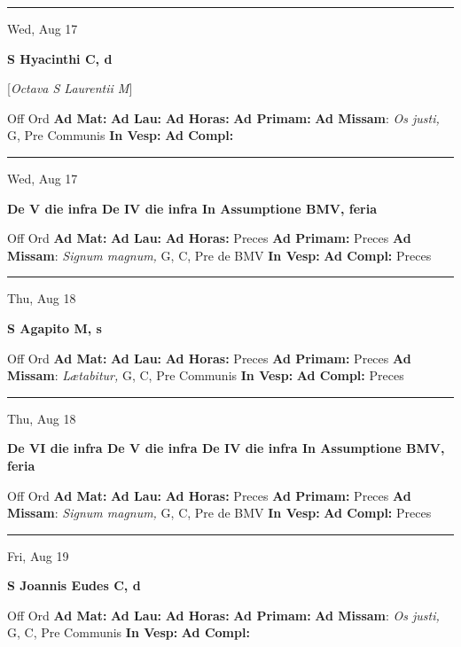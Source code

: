\documentclass[letterpaper, 10pt]{article}
\begin{document}
\hrule
\begin{center}
Wed, Aug 17
\end{center}\textbf{ \large S Hyacinthi C, \textnormal{\normalsize d}}

[\textit{Octava S Laurentii M}]
\begin{justify}
Off Ord
\textbf{Ad Mat: }
\textbf{Ad Lau: }
\textbf{Ad Horas: }
\textbf{Ad Primam: }
\textbf{Ad Missam}: \textit{Os justi,} G, Pre Communis
\textbf{In Vesp: }
\textbf{Ad Compl: }\end{justify}



\hrule
\begin{center}
Wed, Aug 17
\end{center}\textbf{ \large De V die infra De IV die infra In Assumptione BMV, \textnormal{\normalsize feria}}
\begin{justify}
Off Ord
\textbf{Ad Mat: }
\textbf{Ad Lau: }
\textbf{Ad Horas: }Preces
\textbf{Ad Primam: }Preces
\textbf{Ad Missam}: \textit{Signum magnum,} G, C, Pre de BMV
\textbf{In Vesp: }
\textbf{Ad Compl: }Preces\end{justify}



\hrule
\begin{center}
Thu, Aug 18
\end{center}\textbf{ \large S Agapito M, \textnormal{\normalsize s}}
\begin{justify}
Off Ord
\textbf{Ad Mat: }
\textbf{Ad Lau: }
\textbf{Ad Horas: }Preces
\textbf{Ad Primam: }Preces
\textbf{Ad Missam}: \textit{Lætabitur,} G, C, Pre Communis
\textbf{In Vesp: }
\textbf{Ad Compl: }Preces\end{justify}



\hrule
\begin{center}
Thu, Aug 18
\end{center}\textbf{ \large De VI die infra De V die infra De IV die infra In Assumptione BMV, \textnormal{\normalsize feria}}
\begin{justify}
Off Ord
\textbf{Ad Mat: }
\textbf{Ad Lau: }
\textbf{Ad Horas: }Preces
\textbf{Ad Primam: }Preces
\textbf{Ad Missam}: \textit{Signum magnum,} G, C, Pre de BMV
\textbf{In Vesp: }
\textbf{Ad Compl: }Preces\end{justify}



\hrule
\begin{center}
Fri, Aug 19
\end{center}\textbf{ \large S Joannis Eudes C, \textnormal{\normalsize d}}
\begin{justify}
Off Ord
\textbf{Ad Mat: }
\textbf{Ad Lau: }
\textbf{Ad Horas: }
\textbf{Ad Primam: }
\textbf{Ad Missam}: \textit{Os justi,} G, C, Pre Communis
\textbf{In Vesp: }
\textbf{Ad Compl: }\end{justify}
\end{document}

